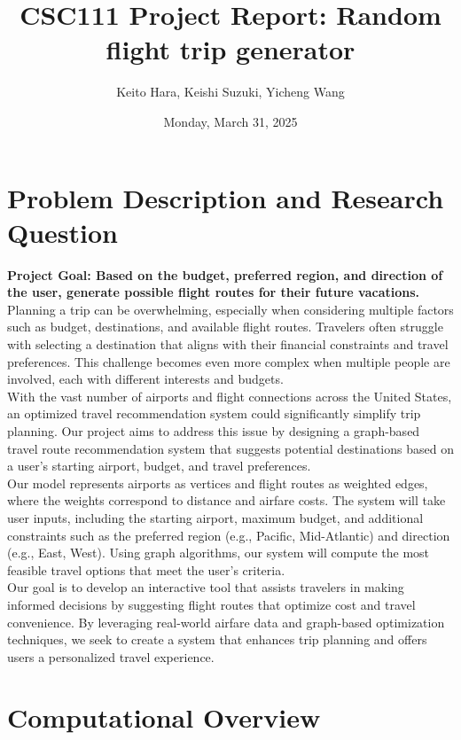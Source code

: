 \documentclass[fontsize=11pt]{article}
\title{CSC111 Project Report: Random flight trip generator}
\author{Keito Hara, Keishi Suzuki, Yicheng Wang}
\date{Monday, March 31, 2025}
\begin{document}
\maketitle

\section*{Problem Description and Research Question}

\textbf{Project Goal: Based on the budget, preferred region, and direction of the user, generate possible flight routes for their future vacations.}\\

Planning a trip can be overwhelming, especially when considering multiple factors such as budget, destinations, and available flight routes. Travelers often struggle with selecting a destination that aligns with their financial constraints and travel preferences. This challenge becomes even more complex when multiple people are involved, each with different interests and budgets.\\

With the vast number of airports and flight connections across the United States, an optimized travel recommendation system could significantly simplify trip planning. Our project aims to address this issue by designing a graph-based travel route recommendation system that suggests potential destinations based on a user’s starting airport, budget, and travel preferences.\\

Our model represents airports as vertices and flight routes as weighted edges, where the weights correspond to distance and airfare costs. The system will take user inputs, including the starting airport, maximum budget, and additional constraints such as the preferred region (e.g., Pacific, Mid-Atlantic) and direction (e.g., East, West). Using graph algorithms, our system will compute the most feasible travel options that meet the user’s criteria.\\

Our goal is to develop an interactive tool that assists travelers in making informed decisions by suggesting flight routes that optimize cost and travel convenience. By leveraging real-world airfare data and graph-based optimization techniques, we seek to create a system that enhances trip planning and offers users a personalized travel experience.


\section*{Computational Overview}
\end{document}
